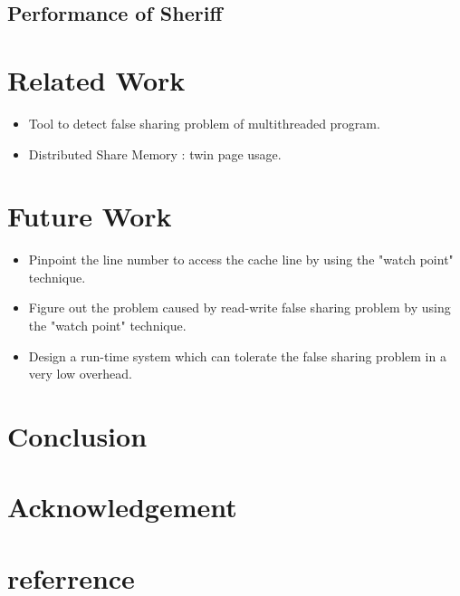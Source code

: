 \documentclass[10pt]{sigplanconf}
\begin{document}
\subsection{Performance of Sheriff}

\section{Related Work}
\label{sec:relatework}
\begin{itemize} 
\item Tool to detect false sharing problem of multithreaded program.
\item Distributed Share Memory : twin page usage.
\end{itemize}

\section{Future Work}
\begin{itemize}
\item Pinpoint the line number to access the cache line by using the "watch point" technique.
\item Figure out the problem caused by read-write false sharing problem by using the "watch point" technique. 
\item Design a run-time system which can tolerate the false sharing problem in a very low overhead. 
\end{itemize}

\label{sec:future}


\section{Conclusion}
\label{sec:discussion}

\section{Acknowledgement}
\section{referrence}
%
\end{document}
